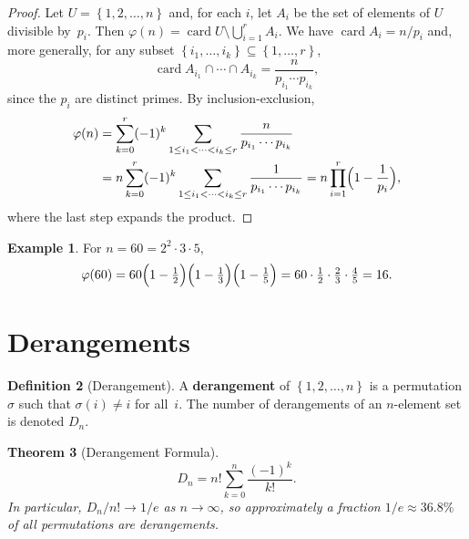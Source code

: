 \documentclass[12pt,a4paper,openany]{book}
\theoremstyle{definition}
\newtheorem{definition}{Definition}[chapter]
\newtheorem{example}[definition]{Example}
\theoremstyle{plain}
\newtheorem{theorem}[definition]{Theorem}
\theoremstyle{remark}
\newcommand{\set}[1]{\left\{#1\right\}}
\DeclareMathOperator{\card}{card}
\begin{document}
\begin{proof}
Let $U = \set{1, 2, \dots, n}$ and, for each $i$, let $A_i$ be the set
of elements of $U$ divisible by~$p_i$.  Then $\varphi(n) = \card{U
\setminus \bigcup_{i=1}^r A_i}$.  We have $\card{A_i} = n/p_i$ and,
more generally, for any subset $\set{i_1,\dots,i_k}\subseteq\set{1,\dots,r}$,
\[
  \card{A_{i_1} \cap \cdots \cap A_{i_k}}
  = \frac{n}{p_{i_1}\cdots p_{i_k}},
\]
since the $p_i$ are distinct primes.  By inclusion-exclusion,
\begin{align*}
  \varphi(n)
  &= \sum_{k=0}^{r} (-1)^k
     \sum_{1\le i_1<\cdots<i_k\le r}
     \frac{n}{p_{i_1}\cdots p_{i_k}} \\
  &= n \sum_{k=0}^{r} (-1)^k
     \sum_{1\le i_1<\cdots<i_k\le r}
     \frac{1}{p_{i_1}\cdots p_{i_k}}
  = n \prod_{i=1}^{r}\Bigl(1-\frac{1}{p_i}\Bigr),
\end{align*}
where the last step expands the product.
\end{proof}

\begin{example}\label{ex:totient-60}
For $n = 60 = 2^2 \cdot 3 \cdot 5$,
\[
  \varphi(60) = 60\Bigl(1-\tfrac{1}{2}\Bigr)\Bigl(1-\tfrac{1}{3}\Bigr)
  \Bigl(1-\tfrac{1}{5}\Bigr) = 60 \cdot \tfrac{1}{2}\cdot \tfrac{2}{3}
  \cdot \tfrac{4}{5} = 16.
\]
\end{example}



\section{Derangements}\label{sec:derangements}

\begin{definition}[Derangement]\label{def:derangement}
A \textbf{derangement} of $\set{1, 2, \dots, n}$ is a permutation
$\sigma$ such that $\sigma(i) \neq i$ for all~$i$.  The number of
derangements of an $n$-element set is denoted $D_n$.
\end{definition}

\begin{theorem}[Derangement Formula]\label{thm:derangement}
\[
  D_n = n!\sum_{k=0}^{n}\frac{(-1)^k}{k!}.
\]
In particular, $D_n/n! \to 1/e$ as $n \to \infty$, so approximately
a fraction $1/e \approx 36.8\%$ of all permutations are derangements.
\end{theorem}
\end{document}

